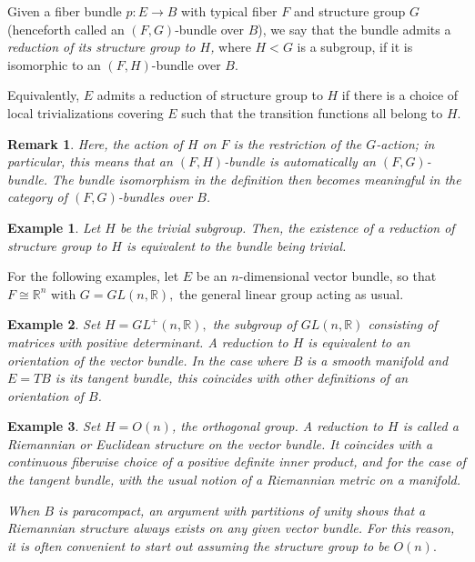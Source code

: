 \documentclass[12pt]{article}
\newcommand{\reals}{{\mathbb R}} %
\newcommand{\funcsig}[2]{#1\rightarrow #2}
\newcommand{\funcdef}[3]{#1:\funcsig{#2}{#3}}
\newtheorem{rmk}{Remark}
\newtheorem{exm}{Example}
\newcommand{\isom}{\cong}
\begin{document}

Given a fiber bundle $\funcdef{p}{E}{B}$ with typical fiber $F$ and structure group $G$ (henceforth called an $(F,G)$-bundle over $B$), we say that the bundle admits a {\em reduction of its structure group to $H$,} where $H<G$ is a subgroup, if it is isomorphic to an $(F,H)$-bundle over $B.$ 


Equivalently, $E$ admits a reduction of structure group to $H$ if there is
a choice of local trivializations covering $E$ such that the transition
functions all belong to $H.$

\begin{rmk}
Here, the action of $H$ on $F$ is the restriction of the $G$-action; in 
particular, this means that an $(F,H)$-bundle is automatically an 
$(F,G)$-bundle. The bundle isomorphism in the definition then becomes meaningful
in the category of $(F,G)$-bundles over $B$.
\end{rmk}

\begin{exm}
Let $H$ be the trivial subgroup. Then, the existence of a reduction of structure group to $H$ is equivalent to the bundle being trivial.
\end{exm}

For the following examples, let $E$ be an $n$-dimensional vector bundle, so that
$F\isom\reals^n$ with $G=GL(n,\reals),$ the general linear group acting as 
usual.

\begin{exm}
Set $H=GL^+(n,\reals),$ the subgroup of $GL(n,\reals)$ consisting of matrices with positive determinant. A reduction to $H$ is equivalent to an orientation of the vector bundle. In the case where $B$ is a smooth manifold and $E=TB$ is its tangent bundle, this coincides with other definitions of an orientation of $B$.
\end{exm}

\begin{exm}
Set $H=O(n)$, the orthogonal group. A reduction to $H$ is called a {\em Riemannian\/} or {\em Euclidean structure\/} on the vector bundle. It coincides with a continuous fiberwise choice
of a positive definite inner product, and for the case of the tangent bundle, 
with the usual notion of a Riemannian metric on a manifold.

When $B$ is paracompact, an argument with partitions of unity shows that
a Riemannian structure always exists on any given vector bundle. For this reason, it is often convenient to start out assuming the structure group
to be $O(n).$
\end{exm}
\end{document}
